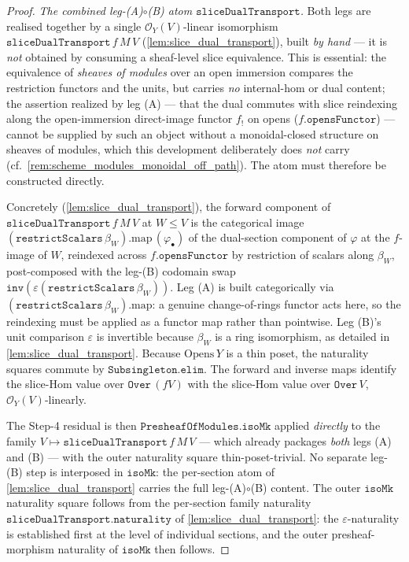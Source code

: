 \begin{proof}
  \emph{The combined leg-(A)\(\circ\)(B) atom \(\mathtt{sliceDualTransport}\).} Both legs are
  realised together by a single \(\mathcal{O}_Y(V)\)-linear isomorphism
  \(\mathtt{sliceDualTransport}\,f\,M\,V\) (\cref{lem:slice_dual_transport}), built
  \emph{by hand} --- it is \emph{not} obtained by consuming a sheaf-level slice equivalence.
  This is essential: the equivalence of \emph{sheaves of modules} over an open immersion
  compares the restriction functors and the units, but carries \emph{no} internal-hom or
  dual content; the assertion realized by leg (A) --- that the dual commutes with slice
  reindexing along the open-immersion direct-image functor \(f_{!}\) on opens
  (\(f.\mathtt{opensFunctor}\)) --- cannot be supplied by such an object without a
  monoidal-closed structure on sheaves of modules, which this development deliberately does
  \emph{not} carry (cf.\ \cref{rem:scheme_modules_monoidal_off_path}). The atom must
  therefore be constructed directly.

  Concretely (\cref{lem:slice_dual_transport}), the forward component of
  \(\mathtt{sliceDualTransport}\,f\,M\,V\) at \(W \le V\) is the categorical image
  \((\mathtt{restrictScalars}\,\beta_W).\mathrm{map}\,(\varphi_{\bullet})\) of the dual-section
  component of \(\varphi\) at the \(f\)-image of \(W\), reindexed across
  \(f.\mathtt{opensFunctor}\) by restriction of scalars along \(\beta_W\), post-composed with
  the leg-(B) codomain swap \(\mathtt{inv}(\varepsilon(\mathtt{restrictScalars}\,\beta_W))\).
  Leg (A) is built categorically via \((\mathtt{restrictScalars}\,\beta_W).\mathrm{map}\):
  a genuine change-of-rings functor acts here, so the reindexing must be applied as a
  functor map rather than pointwise. Leg (B)'s unit comparison \(\varepsilon\) is invertible
  because \(\beta_W\) is a ring isomorphism, as detailed in \cref{lem:slice_dual_transport}.
  Because \(\mathrm{Opens}\,Y\) is a thin poset, the
  naturality squares commute by \(\mathtt{Subsingleton.elim}\). The forward and inverse maps
  identify the slice-Hom value over \(\mathtt{Over}\,(fV)\) with the slice-Hom value over
  \(\mathtt{Over}\,V\), \(\mathcal{O}_Y(V)\)-linearly.

  The Step-4 residual is then \(\mathtt{PresheafOfModules.isoMk}\) applied \emph{directly} to
  the family \(V \mapsto \mathtt{sliceDualTransport}\,f\,M\,V\) --- which already packages
  \emph{both} legs (A) and (B) --- with the outer naturality square thin-poset-trivial. No
  separate leg-(B) step is interposed in \(\mathtt{isoMk}\): the per-section atom of
  \cref{lem:slice_dual_transport} carries the full leg-(A)\(\circ\)(B) content. The outer
  \(\mathtt{isoMk}\) naturality square follows from the per-section family naturality
  \(\mathtt{sliceDualTransport.naturality}\) of \cref{lem:slice_dual_transport}: the
  \(\varepsilon\)-naturality is established first at the level of individual sections, and the
  outer presheaf-morphism naturality of \(\mathtt{isoMk}\) then follows.


\end{proof}
